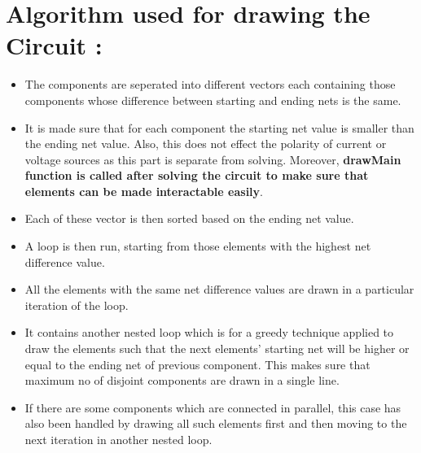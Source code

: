\documentclass[]{article}
\begin{document}
\section{\LARGE Algorithm used for drawing the Circuit :}
\Large 
\begin{itemize}
	\item The components are seperated into different vectors each containing those components whose difference between starting and ending nets is the same.
	\item It is made sure that for each component the starting net value is smaller than the ending net value. Also, this does not effect the polarity of current or voltage sources as this part is separate from solving. Moreover, \textbf{drawMain function is called after solving the circuit to make sure that elements can be made interactable easily}.
	\item Each of these vector is then sorted based on the ending net value. 
	\item A loop is then run, starting from those elements with the highest net difference value. 
	\item All the elements with the same net difference values are drawn in a particular iteration of the loop.
	\item It contains another nested loop which is for a greedy technique applied to draw the elements such that the next elements' starting net will be higher or equal to the ending net of previous component. This makes sure that maximum no of disjoint components are drawn in a single line. 
	\item If there are some components which are connected in parallel, this case has also been handled by drawing all such elements first and then moving to the next iteration in another nested loop. 
\end{itemize}
\end{document}
